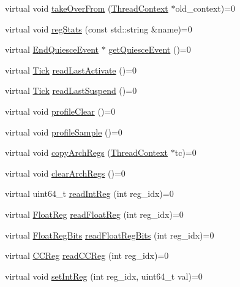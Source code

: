 \begin{DoxyCompactItemize}
virtual void \hyperlink{classThreadContext_ace6314826c59aeddaa2c1091bb3d92e1}{takeOverFrom} (\hyperlink{classThreadContext}{ThreadContext} $\ast$old\_\-context)=0
\item 
virtual void \hyperlink{classThreadContext_a6450b5fad5603ec545c4bf5ff01e0646}{regStats} (const std::string \&name)=0
\item 
virtual \hyperlink{classEndQuiesceEvent}{EndQuiesceEvent} $\ast$ \hyperlink{classThreadContext_ace05cbb8c4644ab69ad2ce815a259669}{getQuiesceEvent} ()=0
\item 
virtual \hyperlink{base_2types_8hh_a5c8ed81b7d238c9083e1037ba6d61643}{Tick} \hyperlink{classThreadContext_a99574c7f076a26875232079962cbe522}{readLastActivate} ()=0
\item 
virtual \hyperlink{base_2types_8hh_a5c8ed81b7d238c9083e1037ba6d61643}{Tick} \hyperlink{classThreadContext_affe95ad96bb334a8132f9c69291f39a4}{readLastSuspend} ()=0
\item 
virtual void \hyperlink{classThreadContext_ac9ebb698bd789f38c55af10256aab7e8}{profileClear} ()=0
\item 
virtual void \hyperlink{classThreadContext_a46e9ef08695527c8b4bd0e668bced5a8}{profileSample} ()=0
\item 
virtual void \hyperlink{classThreadContext_a60461cf605ce8cbd4b61268e9031168d}{copyArchRegs} (\hyperlink{classThreadContext}{ThreadContext} $\ast$tc)=0
\item 
virtual void \hyperlink{classThreadContext_ae0375c0a094eeb6fe8f73db4393d4ceb}{clearArchRegs} ()=0
\item 
virtual uint64\_\-t \hyperlink{classThreadContext_af80734776d68e6acd48e22f6c999394a}{readIntReg} (int reg\_\-idx)=0
\item 
virtual \hyperlink{classThreadContext_a75484259f1855aabc8d74c6eb1cfe186}{FloatReg} \hyperlink{classThreadContext_a7883083f396dee2160e4b8640d02f5f6}{readFloatReg} (int reg\_\-idx)=0
\item 
virtual \hyperlink{classThreadContext_aab5eeae86499f9bfe15ef79360eccc64}{FloatRegBits} \hyperlink{classThreadContext_a66bf9e1bf11ad15d1903209dd37014c5}{readFloatRegBits} (int reg\_\-idx)=0
\item 
virtual \hyperlink{classThreadContext_a0c9de550a32808e6a25b54b6c791d5ab}{CCReg} \hyperlink{classThreadContext_af924a3ae757b2a311dd16bc8acde1c27}{readCCReg} (int reg\_\-idx)=0
\item 
virtual void \hyperlink{classThreadContext_a995ac11ab79af59e135d473df10c72da}{setIntReg} (int reg\_\-idx, uint64\_\-t val)=0

\end{DoxyCompactItemize}
